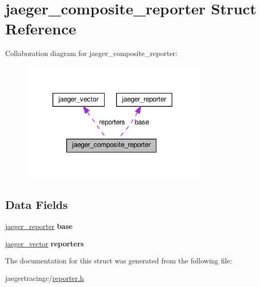 \hypertarget{structjaeger__composite__reporter}{}\section{jaeger\+\_\+composite\+\_\+reporter Struct Reference}
\label{structjaeger__composite__reporter}


Collaboration diagram for jaeger\+\_\+composite\+\_\+reporter\+:\nopagebreak
\begin{figure}[H]
\begin{center}
\leavevmode
\includegraphics[width=254pt]{structjaeger__composite__reporter__coll__graph}
\end{center}
\end{figure}
\subsection*{Data Fields}
\begin{DoxyCompactItemize}
\item 
\mbox{\label{structjaeger__composite__reporter_a453a9d8f7687b566527162f37af62db6}} 
\mbox{\hyperlink{structjaeger__reporter}{jaeger\+\_\+reporter}} {\bfseries base}
\item 
\mbox{\label{structjaeger__composite__reporter_a47166572f9bcadee17edf3a73a6d6311}} 
\mbox{\hyperlink{structjaeger__vector}{jaeger\+\_\+vector}} {\bfseries reporters}
\end{DoxyCompactItemize}


The documentation for this struct was generated from the following file\+:\begin{DoxyCompactItemize}
\item 
jaegertracingc/\mbox{\hyperlink{reporter_8h}{reporter.\+h}}\end{DoxyCompactItemize}
